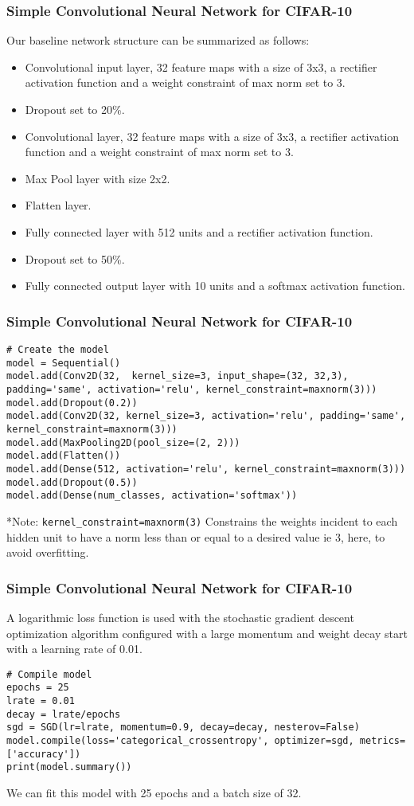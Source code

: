 \begin{frame}[fragile] \frametitle{Simple Convolutional Neural Network for CIFAR-10}
Our baseline network structure can be summarized as follows:
\begin{itemize}
\item Convolutional input layer, 32 feature maps with a size of 3x3, a rectifier activation function and a weight constraint of max norm set to 3.
\item     Dropout set to 20\%.
\item     Convolutional layer, 32 feature maps with a size of 3x3, a rectifier activation function and a weight constraint of max norm set to 3.
\item     Max Pool layer with size 2x2.
\item     Flatten layer.
\item     Fully connected layer with 512 units and a rectifier activation function.
\item     Dropout set to 50\%.
\item     Fully connected output layer with 10 units and a softmax activation function.

\end{itemize}
\end{frame}

\begin{frame}[fragile] \frametitle{Simple Convolutional Neural Network for CIFAR-10}
\begin{lstlisting}
# Create the model
model = Sequential()
model.add(Conv2D(32,  kernel_size=3, input_shape=(32, 32,3), padding='same', activation='relu', kernel_constraint=maxnorm(3)))
model.add(Dropout(0.2))
model.add(Conv2D(32, kernel_size=3, activation='relu', padding='same', kernel_constraint=maxnorm(3)))
model.add(MaxPooling2D(pool_size=(2, 2)))
model.add(Flatten())
model.add(Dense(512, activation='relu', kernel_constraint=maxnorm(3)))
model.add(Dropout(0.5))
model.add(Dense(num_classes, activation='softmax'))
\end{lstlisting}

*Note: \lstinline|kernel_constraint=maxnorm(3)| Constrains the weights incident to each hidden unit to have a norm less than or equal to a desired value ie 3, here, to avoid overfitting.
\end{frame}

\begin{frame}[fragile] \frametitle{Simple Convolutional Neural Network for CIFAR-10}
A logarithmic loss function is used with the stochastic gradient descent optimization algorithm configured with a large momentum and weight decay start with a learning rate of 0.01.
\begin{lstlisting}
# Compile model
epochs = 25
lrate = 0.01
decay = lrate/epochs
sgd = SGD(lr=lrate, momentum=0.9, decay=decay, nesterov=False)
model.compile(loss='categorical_crossentropy', optimizer=sgd, metrics=['accuracy'])
print(model.summary())
\end{lstlisting}
We can fit this model with 25 epochs and a batch size of 32.
\end{frame}

